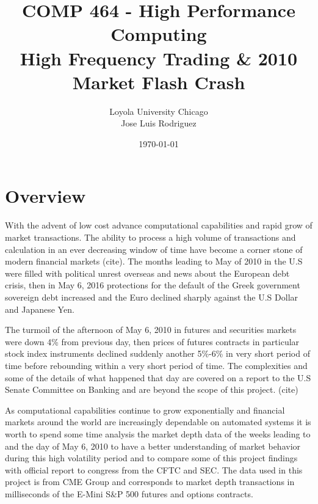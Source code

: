 \documentclass[12pt]{article} %
\title{COMP 464 - High Performance Computing \\ High Frequency Trading \& 2010 Market Flash Crash} %
\author{
Loyola University Chicago \\
Jose Luis Rodriguez 
} %
\date{\today} %
\begin{document}
\maketitle

\thispagestyle{fancy}


\section{Overview}

With the advent of low cost advance computational capabilities and rapid grow of market transactions. The ability to process a high volume of transactions and calculation in an ever decreasing window of time have become a corner stone of modern financial markets (cite). The months leading to May of 2010 in the U.S were filled with political unrest overseas and news about the European debt crisis, then in May 6, 2016 protections for the default of the Greek government sovereign debt increased and the Euro declined sharply against the U.S Dollar and Japanese Yen. 

The turmoil of the afternoon of May 6, 2010 in futures and securities markets were down 4\% from previous day, then prices of futures contracts in particular stock index instruments declined suddenly another 5\%-6\% in very short period of time before rebounding within a very short period of time. The complexities and some of the details of what happened that day are covered on a report to the U.S Senate Committee on Banking and are beyond the scope of this project. (cite)

\newpage

As computational capabilities continue to grow exponentially and financial markets around the world are increasingly dependable on automated systems it is worth to spend some time analysis the market depth data of the weeks leading to and the day of May 6, 2010 to have a better understanding of market behavior during this high volatility period and to compare some of this project findings with official report to congress from the CFTC and SEC. The data used in this project is from CME Group and corresponds to market depth transactions in milliseconds of the E-Mini S\&P 500 futures and options contracts. 

\end{document}
